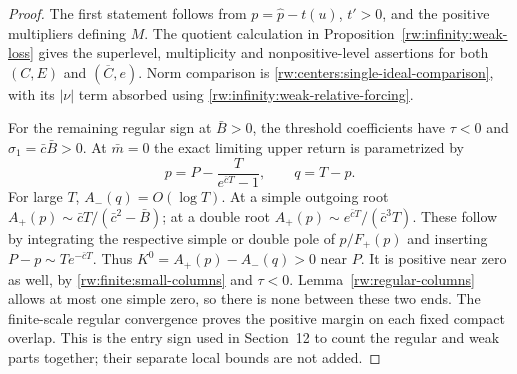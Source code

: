 \begin{proof}
The first statement follows from $p=\widehat p-t(u)$, $t'>0$,
and the positive multipliers defining $M$.
The quotient calculation in Proposition~\ref{rw:infinity:weak-loss}
gives the superlevel, multiplicity and nonpositive-level assertions
for both $(C,E)$ and $(\overline C,e)$.
Norm comparison is \eqref{rw:centers:single-ideal-comparison},
with its $|\nu|$ term absorbed using
\eqref{rw:infinity:weak-relative-forcing}.

For the remaining regular sign at $\bar B>0$, the threshold
coefficients have $\tau<0$ and $\sigma_1=\bar c\bar B>0$.
At $\bar m=0$ the exact limiting upper return is parametrized by
\[
 p=P-\frac{T}{e^{\bar cT}-1},\qquad q=T-p.
\]
For large $T$, $A_-(q)=O(\log T)$. At a simple outgoing root
$A_+(p)\sim\bar cT/(\bar c^2-\bar B)$; at a double root
$A_+(p)\sim e^{\bar cT}/(\bar c^3T)$.
These follow by integrating the respective simple or double pole
of $p/F_+(p)$ and inserting $P-p\sim Te^{-\bar cT}$.
Thus $K^0=A_+(p)-A_-(q)>0$ near $P$. It is positive near zero
as well, by \eqref{rw:finite:small-columns} and $\tau<0$.
Lemma~\ref{rw:regular-columns} allows at most one simple zero,
so there is none between these two ends. The finite-scale regular
convergence proves the positive margin on each fixed compact overlap.
This is the entry sign used in Section~12 to count the regular and
weak parts together; their separate local bounds are not added.
\end{proof}

